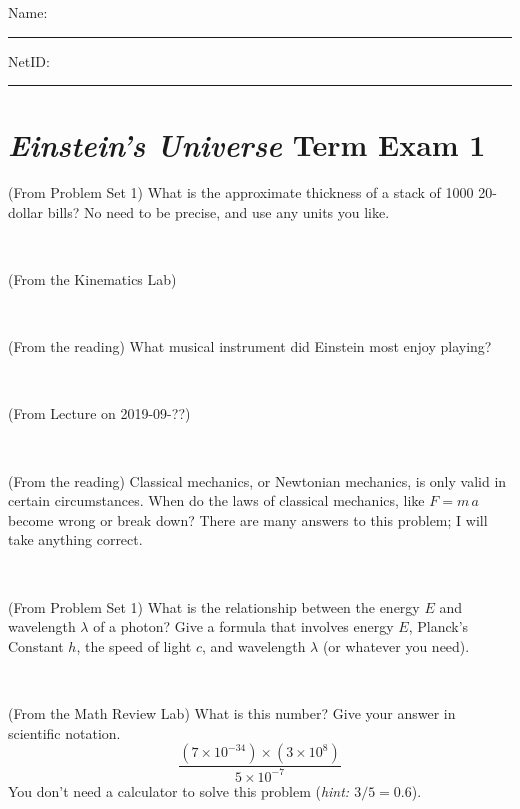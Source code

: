 \documentclass[12pt, letterpaper]{article}
\begin{document}
\cleardoublepage



\noindent
Name: \rule[-1ex]{0.60\textwidth}{0.1pt}
NetID: \rule[-1ex]{0.20\textwidth}{0.1pt}

\section*{\textsl{Einstein's Universe} Term Exam 1}
\setcounter{problem}{1}


\begin{problem} (From Problem Set 1)
What is the approximate thickness of a stack of 1000 20-dollar bills?
No need to be precise, and use any units you like.
\end{problem}


\vfill ~

\begin{problem} (From the Kinematics Lab)

\end{problem}


\vfill ~

\begin{problem} (From the reading)
What musical instrument did Einstein most enjoy playing?
\end{problem}


\vfill ~

\begin{problem} (From Lecture on 2019-09-??)
\end{problem}


\vfill ~


\clearpage


\begin{problem} (From the reading)
Classical mechanics, or Newtonian mechanics, is only valid in certain
circumstances. When do the laws of classical mechanics, like $F =
m\,a$ become wrong or break down? There are many answers to this
problem; I will take anything correct.
\end{problem}


\vfill ~

\begin{problem} (From Problem Set 1)
What is the relationship between the energy $E$ and wavelength
$\lambda$ of a photon? Give a formula that involves energy $E$,
Planck's Constant $h$, the speed of light $c$, and wavelength
$\lambda$ (or whatever you need).
\end{problem}

\vfill ~

\begin{problem} (From the Math Review Lab)
What is this number? Give your answer in scientific notation.
$$
\frac{(7\times10^{-34})\times(3\times10^8)}{5\times10^{-7}}
$$
You don't need a calculator to solve this problem (\textit{hint: $3/5=0.6$}).
\end{problem}
\end{document}
